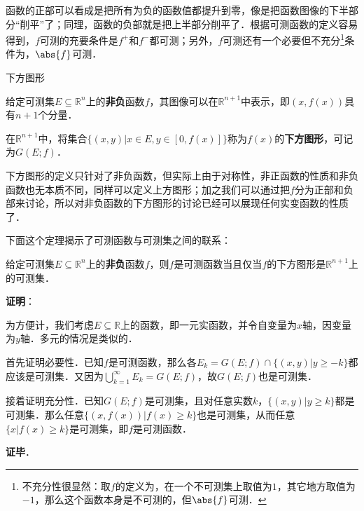 函数的正部可以看成是把所有为负的函数值都提升到零，像是把函数图像的下半部分“削平”了；同理，函数的负部就是把上半部分削平了．根据可测函数的定义容易得到，$f$可测的充要条件是$f^+$和$f^-$都可测；另外，$f$可测还有一个必要但不充分\footnote{不充分性很显然：取$f$的定义为，在一个不可测集上取值为$1$，其它地方取值为$-1$，那么这个函数本身是不可测的，但$\abs{f}$可测．}条件为，$\abs{f}$可测．

\begin{definition}{下方图形}

给定可测集$E\subseteq\mathbb{R}^n$上的\textbf{非负}函数$f$，其图像可以在$\mathbb{R}^{n+1}$中表示，即$(x, f(x))$具有$n+1$个分量．

在$\mathbb{R}^{n+1}$中，将集合$\{(x, y)|x\in E, y\in [0, f(x)]\}$称为$f(x)$的\textbf{下方图形}，可记为$G(E; f)$．

\end{definition}

下方图形的定义只针对了非负函数，但实际上由于对称性，非正函数的性质和非负函数也无本质不同，同样可以定义上方图形；加之我们可以通过把$f$分为正部和负部来讨论，所以对非负函数的下方图形的讨论已经可以展现任何实变函数的性质了．

下面这个定理揭示了可测函数与可测集之间的联系：

\begin{theorem}{}

给定可测集$E\subseteq\mathbb{R}^n$上的\textbf{非负}函数$f$，则$f$是可测函数当且仅当$f$的下方图形是$\mathbb{R}^{n+1}$上的可测集．

\end{theorem}

\textbf{证明}：

为方便计，我们考虑$E\subseteq\mathbb{R}$上的函数，即一元实函数，并令自变量为$x$轴，因变量为$y$轴．多元的情况是类似的．

首先证明必要性．已知$f$是可测函数，那么各$E_k=G(E; f)\cap\{(x, y)|y\geq -k\}$都应该是可测集．又因为$\bigcup^\infty_{k=1} E_k=G(E; f)$，故$G(E; f)$也是可测集．

接着证明充分性．已知$G(E; f)$是可测集，且对任意实数$k$，$\{(x, y)|y\geq k\}$都是可测集．那么任意$\{(x, f(x))|f(x)\geq k\}$也是可测集，从而任意$\{x|f(x)\geq k\}$是可测集，即$f$是可测函数．

\textbf{证毕}．



